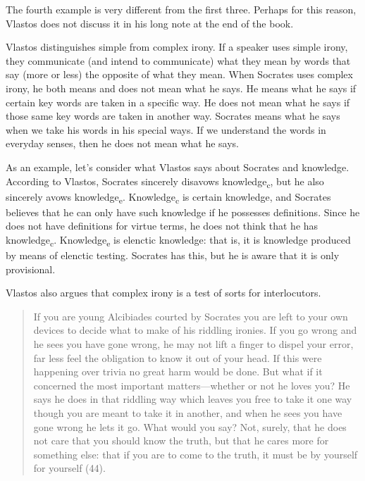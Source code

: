 \documentclass[12pt,letterpaper]{article}
\begin{document}
The fourth example is very different from the first three.
Perhaps for this reason, Vlastos does not discuss it in his long note at the end of the book.

Vlastos distinguishes simple from complex irony.
If a speaker uses simple irony, they communicate (and intend to communicate) what they mean by words that say (more or less) the opposite of what they mean.
When Socrates uses complex irony, he both means and does not mean what he says.
He means what he says if certain key words are taken in a specific way.
He does not mean what he says if those same key words are taken in another way.
Socrates means what he says when we take his words in his special ways.
If we understand the words in everyday senses, then he does not mean what he says.


As an example, let's consider what Vlastos says about Socrates and knowledge.
According to Vlastos, Socrates sincerely disavows knowledge\textsubscript{c}, but he also sincerely avows knowledge\textsubscript{e}.
Knowledge\textsubscript{c} is certain knowledge, and Socrates believes that he can only have such knowledge if he possesses definitions.
Since he does not have definitions for virtue terms, he does not think that he has knowledge\textsubscript{c}.
Knowledge\textsubscript{e} is elenctic knowledge: that is, it is knowledge produced by means of elenctic testing.
Socrates has this, but he is aware that it is only provisional.

Vlastos also argues that complex irony is a test of sorts for interlocutors.

\begin{quote}

    If you are young Alcibiades courted by Socrates you are left to your own devices to decide what to make of his riddling ironies.
If you go wrong and he sees you have gone wrong, he may not lift a finger to dispel your error, far less feel the obligation to know it out of your head.
If this were happening over trivia no great harm would be done.
But what if it concerned the most important matters—whether or not he loves you?
He says he does in that riddling way which leaves you free to take it one way though you are meant to take it in another, and when he sees you have gone wrong he lets it go.
What would you say?
Not, surely, that he does not care that you should know the truth, but that he cares more for something else: that if you are to come to the truth, it must be by yourself for yourself (44).

\end{quote}
\end{document}

